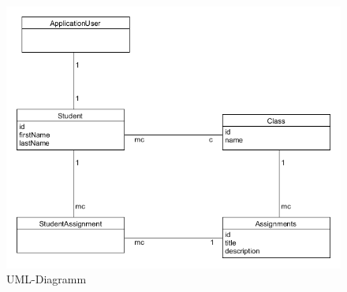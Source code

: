 \documentclass[a4paper, titlepage]{article}
\begin{document}
    \begin{figure}
        \includegraphics[width=\textwidth]{uml}
        \caption{UML-Diagramm}
    \end{figure}
    

    \newpage
    \printbibliography
\end{document}
